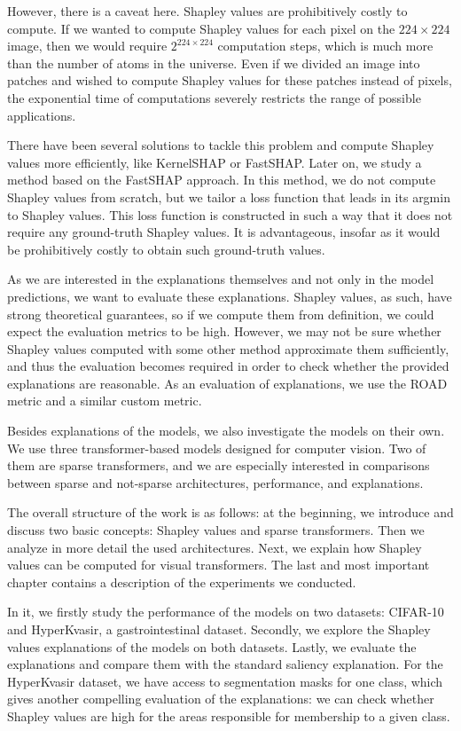 \documentclass[magisterska,en]{pracamgr}
\begin{document}
However, there is a caveat here. Shapley values are prohibitively costly to compute. If we wanted to compute Shapley values for each pixel on the $224 \times 224$ image, then we would require $2^{224\times 224}$ computation steps, which is much more than the number of atoms in the universe. Even if we divided an image into patches and wished to compute Shapley values for these patches instead of pixels, the exponential time of computations severely restricts the range of possible applications.

There have been several solutions to tackle this problem and compute Shapley values more efficiently, like KernelSHAP or FastSHAP. Later on, we study a method based on the FastSHAP approach. In this method, we do not compute Shapley values from scratch, but we tailor a loss function that leads in its argmin to Shapley values. This loss function is constructed in such a way that it does not require any ground-truth Shapley values. It is advantageous, insofar as it would be prohibitively costly to obtain such ground-truth values.

As we are interested in the explanations themselves and not only in the model predictions, we want to evaluate these explanations. Shapley values, as such, have strong theoretical guarantees, so if we compute them from definition, we could expect the evaluation metrics to be high. However, we may not be sure whether Shapley values computed with some other method approximate them sufficiently, and thus the evaluation becomes required in order to check whether the provided explanations are reasonable. As an evaluation of explanations, we use the ROAD metric and a similar custom metric.


Besides explanations of the models, we also investigate the models on their own. We use three transformer-based models designed for computer vision. Two of them are sparse transformers, and we are especially interested in comparisons between sparse and not-sparse architectures, performance, and explanations.


The overall structure of the work is as follows: at the beginning, we introduce and discuss two basic concepts: Shapley values and sparse transformers. Then we analyze in more detail the used architectures. Next, we explain how Shapley values can be computed for visual transformers. The last and most important chapter contains a description of the experiments we conducted.


In it, we firstly study the performance of the models on two datasets: CIFAR-10 and HyperKvasir, a gastrointestinal dataset. Secondly, we explore the Shapley values explanations of the models on both datasets. Lastly, we evaluate  the explanations and compare them with the standard saliency explanation. For the HyperKvasir dataset, we have access to segmentation masks for one class, which gives another compelling evaluation of the explanations: we can check whether Shapley values are high for the areas responsible for membership to a given class.
\end{document}
